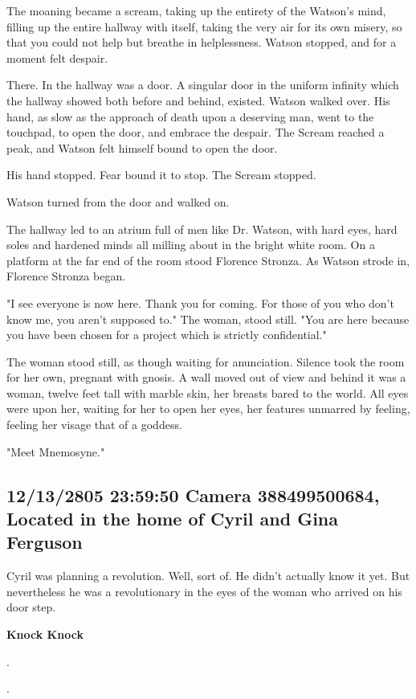 \documentclass[12pt]{article}
\begin{document}
The moaning became a scream, taking up the entirety of the Watson's mind, filling up the entire hallway with itself, taking the very air for its own misery, so that you could not help but breathe in helplessness. Watson stopped, and for a moment felt despair.

There. In the hallway was a door. A singular door in the uniform infinity which the hallway showed both before and behind, existed. Watson walked over. His hand, as slow as the approach of death upon a deserving man, went to the touchpad, to open the door, and embrace the despair. The Scream reached a peak, and Watson felt himself bound to open the door. 

His hand stopped. Fear bound it to stop. The Scream stopped.

Watson turned from the door and walked on.

The hallway led to an atrium full of men like Dr. Watson, with hard eyes, hard soles and hardened minds all milling about in the bright white room. On a platform at the far end of the room stood Florence Stronza. As Watson strode in, Florence Stronza began.

"I see everyone is now here. Thank you for coming. For those of you who don't know me, you aren't supposed to." The woman, stood still. "You are here because you have been chosen for a project which is strictly confidential."

The woman stood still, as though waiting for anunciation. Silence took the room for her own, pregnant with gnosis. A wall moved out of view and behind it was a woman, twelve feet tall with marble skin, her breasts bared to the world. All eyes were upon her, waiting for her to open her eyes, her features unmarred by feeling, feeling her visage that of a goddess.

"Meet Mnemosyne."

\subsection*{12/13/2805 23:59:50 Camera 388499500684, Located in the home of Cyril and Gina Ferguson}
\label{sec:org9c4a45a}

Cyril was planning a revolution. Well, sort of. He didn't actually know it yet. But nevertheless he was a revolutionary in the eyes of the woman who arrived on his door step.

\textbf{Knock Knock}

.

.
\end{document}
